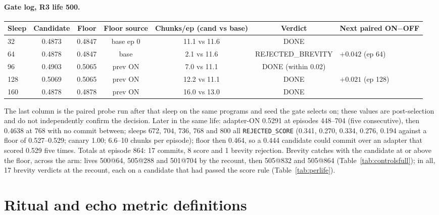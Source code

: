 \documentclass{article}
\newcommand{\onoff}{ON$-$OFF}
\begin{document}
\paragraph{Gate log, R3 life 500.}
\begin{center}\small
\begin{tabular}{lcccccl}
\toprule
Sleep & Candidate & Floor & Floor source & Chunks/ep (cand vs base) & Verdict & Next paired \onoff{} \\
\midrule
32 & 0.4873 & 0.4847 & base ep 0 & 11.1 vs 11.6 & DONE & \\
64 & 0.4878 & 0.4847 & base & 2.1 vs 11.6 & REJECTED\_BREVITY & $+0.042$ (ep 64) \\
96 & 0.4903 & 0.5065 & prev ON & 7.0 vs 11.1 & DONE (within 0.02) & \\
128 & 0.5069 & 0.5065 & prev ON & 12.2 vs 11.1 & DONE & $+0.021$ (ep 128) \\
160 & 0.4878 & 0.4878 & prev ON & 16.0 vs 13.0 & DONE & \\
\bottomrule
\end{tabular}
\end{center}
The last column is the paired probe run after that sleep on the same programs and seed the gate selects on; these values are post-selection and do not independently confirm the decision. Later in the same life: adapter-ON 0.5291 at episodes 448--704 (five consecutive), then 0.4638 at 768 with no commit between; sleeps 672, 704, 736, 768 and 800 all \texttt{REJECTED\_SCORE} (0.341, 0.270, 0.334, 0.276, 0.194 against a floor of 0.527--0.529; canary 1.00; 6.6--10 chunks per episode); floor then 0.464, so a 0.444 candidate could commit over an adapter that scored 0.529 five times. Totals at episode 864: 17 commits, 8 score and 1 brevity rejection. Brevity catches with the candidate at or above the floor, across the arm: lives 500@64, 505@288 and 501@704 by the recount, then 505@832 and 505@864 (Table~\ref{tab:controlsfull}); in all, 17 brevity verdicts at the recount, each on a candidate that had passed the score rule (Table~\ref{tab:perlife}).

\section{Ritual and echo metric definitions}
\label{app:ritual}
\end{document}
